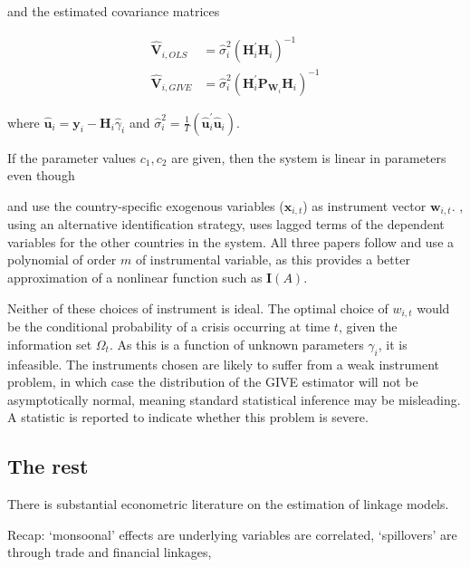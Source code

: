 \documentclass[../base.tex]{subfiles}
\begin{document}
and the estimated covariance matrices

\begin{align*}
	\hat{\mathbf{V}}_{i, OLS} &= \hat{\sigma}^2_i (\mathbf{H}_i^{\prime} \mathbf{H}_i)^{-1} \\
	\hat{\mathbf{V}}_{i, GIVE} &= \hat{\sigma}^2_i (\mathbf{H}_i^{\prime} \mathbf{P}_{\mathbf{W}_i} \mathbf{H}_i)^{-1}
\end{align*}


where $\hat{\mathbf{u}}_i = \mathbf{y}_i - \mathbf{H}_i \hat{\gamma}_i$ and $\hat{\sigma}^2_i = \frac{1}{T} (\hat{\mathbf{u}}_i^{\prime} \hat{\mathbf{u}}_i)$. 

If the parameter values $c_1, c_2$ are given, then the system is linear in parameters even though 

\cite{pesaran2007econometrics} and \cite{massacci2007identification} use the country-specific exogenous variables ($\mathbf{x}_{i,t}$) as instrument vector $\mathbf{w}_{i,t}$. \cite{metiu2012sovereign}, using an alternative identification strategy, uses lagged terms of the dependent variables for the other countries in the system. All three papers follow \cite{kelejian1971two} and use a polynomial of order $m$ of instrumental variable, as this provides a better approximation of a nonlinear function such as $\mathbf{I}(A)$.

Neither of these choices of instrument is ideal. The optimal choice of $w_{i,t}$ would be the conditional probability of a crisis occurring at time $t$, given the information set $\Omega_t$. As this is a function of unknown parameters $\gamma_i$, it is infeasible. The instruments chosen are likely to suffer from a weak instrument problem, in which case the distribution of the GIVE estimator will not be asymptotically normal, meaning standard statistical inference may be misleading. A \cite{cragg1993testing} statistic is reported to indicate whether this problem is severe. 



\subsection{The rest}






There is substantial econometric literature on the estimation of linkage models. 

Recap: `monsoonal' effects are underlying variables are correlated, `spillovers' are through trade and financial linkages, 
\end{document}
